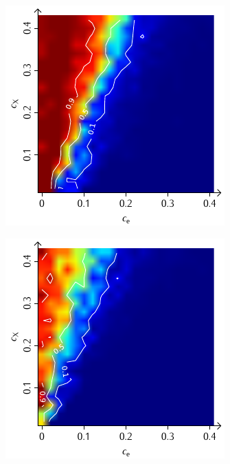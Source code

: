 \documentclass[a4paper, 10pt, twoside, openany]{book} %
\begin{document}
\begin{figure}
    \begin{minipage}[t]{0.48\textwidth}
        \includegraphics[width=\textwidth]{Abbildungen/Phasendiagramme/Konturen/F_cluster_G.pdf}
        \label{F_cluster_G}
    \end{minipage}
    \hfill
    \begin{minipage}[t]{0.48\textwidth}
        \includegraphics[width=\textwidth]{Abbildungen/Phasendiagramme/Konturen/F_penalty_cluster_G.pdf}

\end{minipage}
\end{figure}
\end{document}
